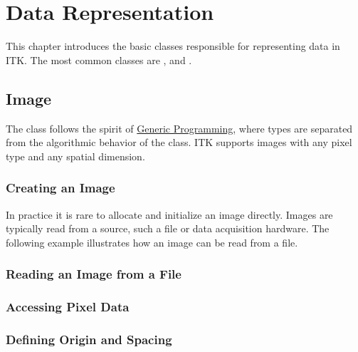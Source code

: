 
\chapter{Data Representation}
\label{sec:DataRepresentation}

This chapter introduces the basic classes responsible
for representing data in ITK. The most common classes are
,  and .

\section{Image}
\label{sec:ImageSection}

The  class follows the spirit of
\href{https://www.boost.org/more/generic_programming.html}{Generic Programming},
where types are separated from the algorithmic behavior of the class.
ITK supports images with any pixel type and any spatial dimension.

\subsection{Creating an Image}\label{sec:CreatingAnImageSection}



In practice it is rare to allocate and initialize an image directly.
Images are typically read from a source, such a file or data acquisition
hardware. The following example illustrates how an image can be read from
a file.


\subsection{Reading an Image from a File}
\label{sec:ReadingImageFromFile}




\subsection{Accessing Pixel Data}
\label{sec:AccessingImagePixelData}




\subsection{Defining Origin and Spacing}
\label{sec:DefiningImageOriginAndSpacing}




